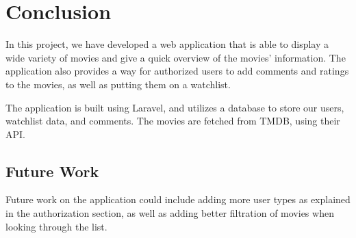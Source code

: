 \section{Conclusion}

In this project, we have developed a web application
that is able to display a wide variety of movies and give a quick overview of the movies' information. 
The application also provides a way for authorized users to add comments and ratings to the movies, 
as well as putting them on a watchlist.\newline

The application is built using Laravel, and utilizes a database to store our users, 
watchlist data, and comments. The movies are fetched from TMDB, using their API. \newline

\subsection{Future Work}
Future work on the application could include adding more user types as explained in the authorization section, 
as well as adding better filtration of movies when looking through the list. \newline